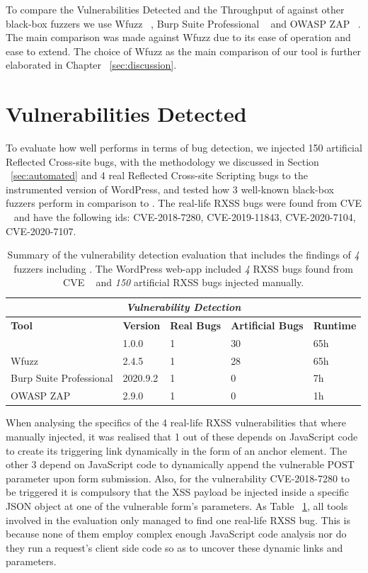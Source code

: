 To compare the Vulnerabilities Detected and the Throughput of \pname{} against other black-box fuzzers we use Wfuzz ~\cite{wfuzz}, Burp Suite Professional ~\cite{burp} and OWASP ZAP ~\cite{ owaspzap}. The main comparison was made against Wfuzz due to its ease of operation and ease to extend. The choice of Wfuzz as the main comparison of our tool is further elaborated in Chapter ~\ref{sec:discussion}.

\section{Vulnerabilities Detected}
To evaluate how well \pname{} performs in terms of bug detection, we injected 150 artificial  Reflected Cross-site bugs, with the methodology we discussed in Section ~\ref{sec:automated} and 4 real Reflected Cross-site Scripting bugs to the instrumented version of WordPress, and tested how 3 well-known black-box fuzzers perform in comparison to \pname{}. The real-life RXSS bugs were found from CVE ~\cite{cve} and have the following ids: CVE-2018-7280, CVE-2019-11843, CVE-2020-7104, CVE-2020-7107.

\begin{table}[ht]
\centering
 \begin{tabular}{@{}|l|l|l|l|l|@{}}
 \hline
  \multicolumn{5}{|c|}{\textit{\textbf{Vulnerability Detection}}} \\
 \hline
 \textbf{Tool} & \textbf{Version} & \textbf{Real Bugs} & \textbf{Artificial Bugs} & \textbf{Runtime} \\ 
 \hline\hline
 \pname{} & 1.0.0 & 1 & 30 & 65h  \\ 
 \hline
 Wfuzz & 2.4.5 & 1 & 28 & 65h  \\ 
 \hline
 Burp Suite Professional & 2020.9.2 & 1 & 0 & 7h \\ 
 \hline
 OWASP ZAP  & 2.9.0 & 1 & 0 & 1h  \\
 \hline
 \end{tabular}
 \caption{Summary of the vulnerability detection evaluation that includes the findings of \emph{4} fuzzers including \pname{}. The WordPress web-app included \emph{4} RXSS bugs found from CVE {~\cite{cve}} and \emph{150} artificial RXSS bugs injected manually.}

 \label{tools_table}
\end{table}

When analysing the specifics of the 4 real-life RXSS vulnerabilities that where manually injected, it was realised that 1 out of these depends on JavaScript code to create its triggering link dynamically in the form of an anchor element. The other 3 depend on JavaScript code to dynamically append the vulnerable POST parameter upon form submission. Also, for the vulnerability CVE-2018-7280 to be triggered it is compulsory that the XSS payload be injected inside a specific JSON object at one of the vulnerable form's parameters. As Table ~\ref{tools_table}, all tools involved in the evaluation only managed to find one real-life RXSS bug. This is because none of them employ complex enough JavaScript code analysis nor do they run a request's client side code so as to uncover these dynamic links and parameters.

